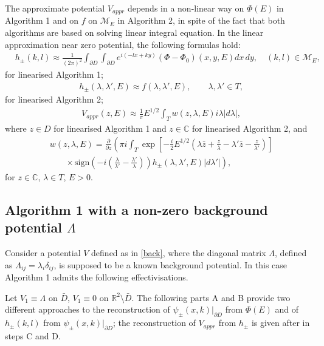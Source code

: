 \documentclass[11pt,a4paper,english,subeqn]{amsart}
\theoremstyle{plain}
\theoremstyle{definition}
\numberwithin{equation}{section}
\begin{document}
The approximate potential $V_{appr}$ depends in a non-linear way on $\Phi(E)$ in Algorithm 1 and on $f$ on ${\mathscr{M}_E}$ in Algorithm 2, in spite of the fact that both algorithms are based on solving linear integral equation. In the linear approximation near zero potential, the following formulas hold:
\begin{align}
&h_{\pm}(k,l) \approx \frac{1}{(2 \pi)^2}\int_{\partial D} \int_{\partial D}e^{i(-lx+ky)}(\Phi - \Phi_0)(x,y,E)dx\,dy, \quad (k,l) \in {\mathscr{M}_E},
\end{align}
for linearised Algorithm 1;
\begin{align} \label{apprh}
&h_{\pm}(\lambda, \lambda',E) \approx f(\lambda, \lambda',E), \qquad \lambda, \lambda' \in T,
\end{align}
for linearised Algorithm 2;
\begin{align}
&V_{appr}(z,E) \approx \frac 1 \pi E^{1/2} \int_T w(z,\lambda, E) i \lambda |d \lambda|,
\end{align}
where $z \in D$ for linearised Algorithm 1 and $z \in {\mathbb{C}}$ for linearised Algorithm 2, and
\begin{align} \label{apprw}
&w(z, \lambda, E) = \frac{\partial}{\partial z}\left( \pi i \int_T \exp\left[ -\frac i 2 E^{1/2} \left( \lambda \bar z + \frac{z}{\lambda} - \lambda' \bar z - \frac{z}{\lambda'} \right) \right] \right. \\ \nonumber
&\qquad \left. \times \, \mathrm{sign}\left(- i \left( \frac{\lambda}{\lambda'} - \frac{\lambda'}{\lambda} \right) \right) h_{\pm}(\lambda,\lambda',E) |d\lambda'| \right),
\end{align} 
for $z \in {\mathbb{C}}$, $\lambda \in T$, $E > 0$.
\subsection{Algorithm 1 with a non-zero background potential $\Lambda$} \label{nonzero}
Consider a potential $V$ defined as in \eqref{back}, where the diagonal matrix $\Lambda$, defined as $\Lambda_{ij} =  \lambda_i \delta_{ij}$, is supposed to be a known background potential. In this case Algorithm 1 admits the following effectivisations.

Let $V_1 \equiv \Lambda$ on $\bar D$, $V_1 \equiv 0$ on ${\mathbb{R}}^2 \setminus \bar D$. The following parts A and B provide two different approaches to the reconstruction of $\psi_{\pm}(x,k)|_{\partial D}$ from $\Phi(E)$ and of $h_{\pm}(k,l)$ from $\psi_{\pm}(x,k)|_{\partial D}$; the reconstruction of $V_{appr}$ from $h_{\pm}$ is given after in steps C and D.
\end{document}
